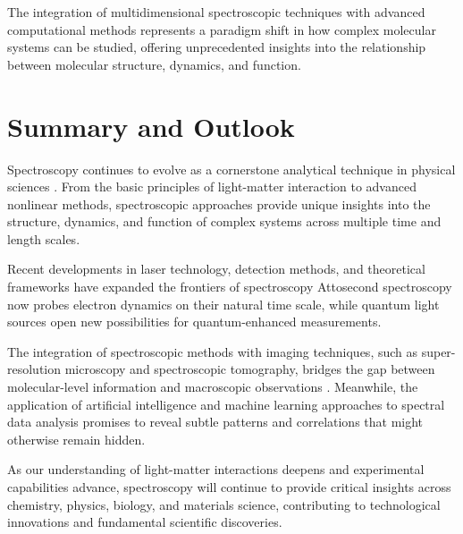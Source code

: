 \noindent The integration of multidimensional spectroscopic techniques with advanced computational methods represents a paradigm shift in how complex molecular systems can be studied, offering unprecedented insights into the relationship between molecular structure, dynamics, and function.


\section{Summary and Outlook}
\label{sec:summary}

\noindent Spectroscopy continues to evolve as a cornerstone analytical technique in physical sciences \cite{Mukamel1995PrinciplesNonlinearOptical, Cho2009TwodimensionalOpticalSpectroscopy}. From the basic principles of light-matter interaction to advanced nonlinear methods, spectroscopic approaches provide unique insights into the structure, dynamics, and function of complex systems across multiple time and length scales.

\noindent Recent developments in laser technology, detection methods, and theoretical frameworks have expanded the frontiers of spectroscopy \cite{Jonas2003TwodimensionalFemtosecondSpectroscopy}%
Attosecond spectroscopy now probes electron dynamics on their natural time scale, while quantum light sources open new possibilities for quantum-enhanced measurements.

\noindent The integration of spectroscopic methods with imaging techniques, such as super-resolution microscopy and spectroscopic tomography, bridges the gap between molecular-level information and macroscopic observations \cite{BrixnerEtAl2004PhasestabilizedTwodimensionalElectronic}.
Meanwhile, the application of artificial intelligence and machine learning approaches to spectral data analysis promises to reveal subtle patterns and correlations that might otherwise remain hidden.

\noindent As our understanding of light-matter interactions deepens and experimental capabilities advance, spectroscopy will continue to provide critical insights across chemistry, physics, biology, and materials science, contributing to technological innovations and fundamental scientific discoveries.